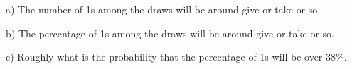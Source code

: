 \documentclass[10pt]{article}
\begin{document}
\hspace{20pt} a) 
The number of 1s among the draws will be around \underline{\hspace{45pt}} 
give or take \underline{\hspace{45pt}}  or so.
\vspace{2.5in}

\hspace{20pt} b) 
The percentage of 1s among the draws will be around \underline{\hspace{45pt}} 
give or take \underline{\hspace{45pt}}  or so.
\vspace{2.5in}

\hspace{20pt} c) Roughly what is the probability that the percentage of 1s will 
be over 38\%.
\end{document}
